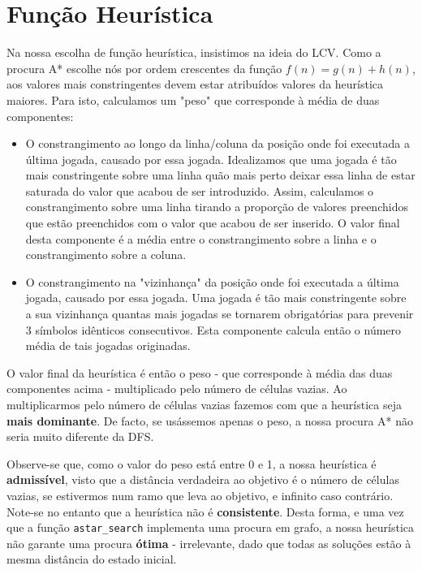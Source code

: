 \documentclass[12pt,a4paper]{article}
\begin{document}
\section*{Função Heurística}

Na nossa escolha de função heurística, insistimos na ideia do LCV. Como a procura A* escolhe nós por ordem crescentes da função $f(n) = g(n) + h(n)$, aos valores mais constringentes devem estar atribuídos valores da heurística maiores. Para isto, calculamos um "peso" que corresponde à média de duas componentes:
\begin{itemize}
  \item O constrangimento ao longo da linha/coluna da posição onde foi executada a última jogada, causado por essa jogada.
        Idealizamos que uma jogada é tão mais constringente sobre uma linha quão mais perto deixar essa linha de estar saturada do valor que acabou de ser introduzido.
        Assim, calculamos o constrangimento sobre uma linha tirando a proporção de valores preenchidos que estão preenchidos com o valor que acabou de ser inserido.
        O valor final desta componente é a média entre o constrangimento sobre a linha e o constrangimento sobre a coluna.
  \item O constrangimento na "vizinhança" da posição onde foi executada a última jogada, causado por essa jogada.
        Uma jogada é tão mais constringente sobre a sua vizinhança quantas mais jogadas se tornarem obrigatórias para prevenir 3 símbolos idênticos consecutivos.
        Esta componente calcula então o número média de tais jogadas originadas.
\end{itemize}

O valor final da heurística é então o peso - que corresponde à média das duas componentes acima - multiplicado pelo número de células vazias.
Ao multiplicarmos pelo número de células vazias fazemos com que a heurística seja \textbf{mais dominante}.
De facto, se usássemos apenas o peso, a nossa procura A* não seria muito diferente da DFS.

Observe-se que, como o valor do peso está entre 0 e 1, a nossa heurística é \textbf{admissível}, visto que a distância verdadeira ao objetivo é o número de células vazias, se estivermos num ramo que leva ao objetivo, e infinito caso contrário.
Note-se no entanto que a heurística não é \textbf{consistente}.
Desta forma, e uma vez que a função \texttt{astar\_search} implementa uma procura em grafo, a nossa heurística não garante uma procura \textbf{ótima} - irrelevante, dado que todas as soluções estão à mesma distância do estado inicial.
\end{document}
